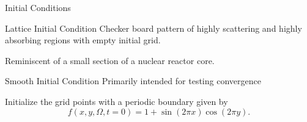\documentclass{beamer}
\begin{document}
    \begin{frame}{Initial Conditions}
        \begin{block}{Lattice Initial Condition}
            Checker board pattern of highly scattering and highly absorbing regions with empty initial grid.

            Reminiscent of a small section of a nuclear reactor core.
        \end{block}

        \vfill

        \begin{block}{Smooth Initial Condition}
            Primarily intended for testing convergence

            Initialize the grid points with a periodic boundary given by
            \begin{equation*}
                f(x,y,\Omega,t=0) = 1 + \sin(2\pi x)\cos(2\pi y).
            \end{equation*}
        \end{block}
    \end{frame}
\end{document}
